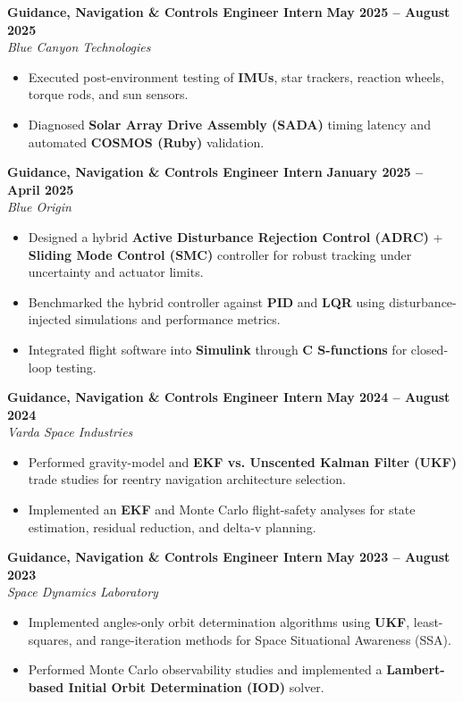 \documentclass[10pt]{article}
\begin{document}
	\textbf{Guidance, Navigation \& Controls Engineer Intern} \hfill \textbf{May 2025 -- August 2025} \\
	\emph{Blue Canyon Technologies}
	\begin{itemize}
		\item Executed post-environment testing of \textbf{IMUs}, star trackers, reaction wheels, torque rods, and sun sensors.
		\item Diagnosed \textbf{Solar Array Drive Assembly (SADA)} timing latency and automated \textbf{COSMOS (Ruby)} validation.
	\end{itemize}
	
	\textbf{Guidance, Navigation \& Controls Engineer Intern} \hfill \textbf{January 2025 -- April 2025} \\
	\emph{Blue Origin}
	\begin{itemize}
		\item Designed a hybrid \textbf{Active Disturbance Rejection Control (ADRC)} + \textbf{Sliding Mode Control (SMC)} controller for robust tracking under uncertainty and actuator limits.
		\item Benchmarked the hybrid controller against \textbf{PID} and \textbf{LQR} using disturbance-injected simulations and performance metrics.
		\item Integrated flight software into \textbf{Simulink} through \textbf{C S-functions} for closed-loop testing.
	\end{itemize}
	
	\textbf{Guidance, Navigation \& Controls Engineer Intern} \hfill \textbf{May 2024 -- August 2024} \\
	\emph{Varda Space Industries}
	\begin{itemize}
		\item Performed gravity-model and \textbf{EKF vs. Unscented Kalman Filter (UKF)} trade studies for reentry navigation architecture selection.
		\item Implemented an \textbf{EKF} and Monte Carlo flight-safety analyses for state estimation, residual reduction, and delta-v planning.
	\end{itemize}
	
	\textbf{Guidance, Navigation \& Controls Engineer Intern} \hfill \textbf{May 2023 -- August 2023} \\
	\emph{Space Dynamics Laboratory}
	\begin{itemize}
		\item Implemented angles-only orbit determination algorithms using \textbf{UKF}, least-squares, and range-iteration methods for Space Situational Awareness (SSA).
		\item Performed Monte Carlo observability studies and implemented a \textbf{Lambert-based Initial Orbit Determination (IOD)} solver.
	\end{itemize}
\end{document}
